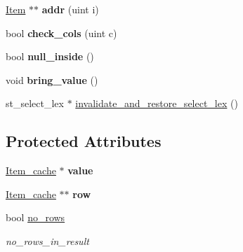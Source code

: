 \begin{DoxyCompactItemize}
\item 
\mbox{\label{classItem__singlerow__subselect_af3e54c1ff9ef3aca3a15d042cebbb084}} 
\mbox{\hyperlink{classItem}{Item}} $\ast$$\ast$ {\bfseries addr} (uint i)
\item 
\mbox{\label{classItem__singlerow__subselect_aea9f79ee7dbb8f9777036838c715d46f}} 
bool {\bfseries check\+\_\+cols} (uint c)
\item 
\mbox{\label{classItem__singlerow__subselect_a8c5b87f0b2d812b51c98d8b77f3ebdda}} 
bool {\bfseries null\+\_\+inside} ()
\item 
\mbox{\label{classItem__singlerow__subselect_a1b3042d86d06b53850d1ffa0ff81601c}} 
void {\bfseries bring\+\_\+value} ()
\item 
st\+\_\+select\+\_\+lex $\ast$ \mbox{\hyperlink{classItem__singlerow__subselect_a7b7df4fb9a68f3f1cbdf629dca4f17cd}{invalidate\+\_\+and\+\_\+restore\+\_\+select\+\_\+lex}} ()
\end{DoxyCompactItemize}
\subsection*{Protected Attributes}
\begin{DoxyCompactItemize}
\item 
\mbox{\label{classItem__singlerow__subselect_aed962c7d996decdf11b59053bd1ddd1b}} 
\mbox{\hyperlink{classItem__cache}{Item\+\_\+cache}} $\ast$ {\bfseries value}
\item 
\mbox{\label{classItem__singlerow__subselect_a8b97bd51c035a7fb018d80ee080d8ec1}} 
\mbox{\hyperlink{classItem__cache}{Item\+\_\+cache}} $\ast$$\ast$ {\bfseries row}
\item 
\mbox{\label{classItem__singlerow__subselect_aceafe4a46d629c19467d25d854ffee72}} 
bool \mbox{\hyperlink{classItem__singlerow__subselect_aceafe4a46d629c19467d25d854ffee72}{no\+\_\+rows}}
\begin{DoxyCompactList}\small\item\em {\ttfamily no\+\_\+rows\+\_\+in\+\_\+result} \end{DoxyCompactList}\end{DoxyCompactItemize}
